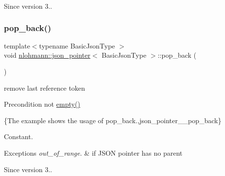 \begin{DoxySince}{Since}
version 3.. 
\end{DoxySince}
\mbox{\label{classnlohmann_1_1json__pointer_a4b1ee4d511ca195bed896a3da47e264c}} 
\subsubsection{\texorpdfstring{pop\+\_\+back()}{pop\_back()}}
{\footnotesize\ttfamily template$<$typename Basic\+Json\+Type $>$ \\
void \mbox{\hyperlink{classnlohmann_1_1json__pointer}{nlohmann\+::json\+\_\+pointer}}$<$ Basic\+Json\+Type $>$\+::pop\+\_\+back (\begin{DoxyParamCaption}{ }\end{DoxyParamCaption})\hspace{0.3cm}{\ttfamily [inline]}}



remove last reference token 

\begin{DoxyPrecond}{Precondition}
not {\ttfamily \mbox{\hyperlink{classnlohmann_1_1json__pointer_a649252bda4a2e75a0915b11a25d8bcc3}{empty()}}}
\end{DoxyPrecond}
\{The example shows the usage of {\ttfamily pop\+\_\+back}.,json\+\_\+pointer\+\_\+\+\_\+pop\+\_\+back\}

Constant.


\begin{DoxyExceptions}{Exceptions}
{\em out\+\_\+of\+\_\+range.} & if J\+S\+ON pointer has no parent\\
\hline
\end{DoxyExceptions}
\begin{DoxySince}{Since}
version 3.. 
\end{DoxySince}
\mbox{\label{classnlohmann_1_1json__pointer_a697d12b5bd6205f8866691b166b7c7dc}} 

